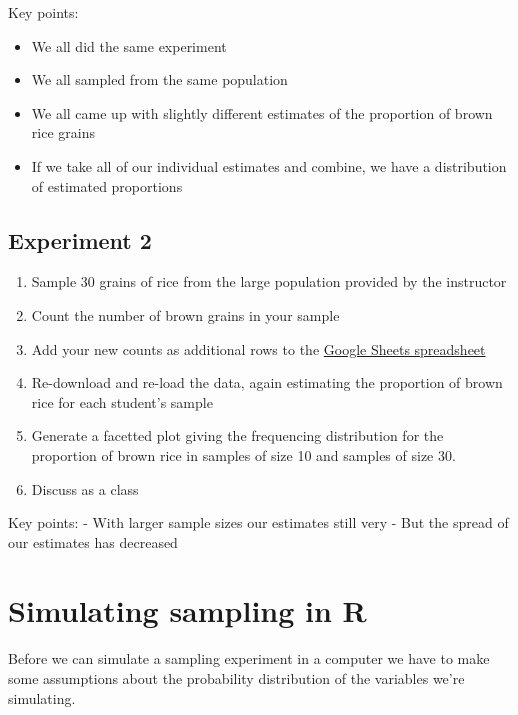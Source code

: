 \documentclass[]{book}
\providecommand{\tightlist}{%
  \setlength{\itemsep}{0pt}\setlength{\parskip}{0pt}}
\theoremstyle{definition}
\theoremstyle{definition}
\theoremstyle{definition}
\theoremstyle{remark}
\begin{document}
Key points:

\begin{itemize}
\tightlist
\item
  We all did the same experiment
\item
  We all sampled from the same population
\item
  We all came up with slightly different estimates of the proportion of
  brown rice grains
\item
  If we take all of our individual estimates and combine, we have a
  distribution of estimated proportions
\end{itemize}

\hypertarget{experiment-2}{%
\subsection{Experiment 2}\label{experiment-2}}

\begin{enumerate}
\def\labelenumi{\arabic{enumi}.}
\tightlist
\item
  Sample 30 grains of rice from the large population provided by the
  instructor
\item
  Count the number of brown grains in your sample
\item
  Add your new counts as additional rows to the
  \href{https://docs.google.com/spreadsheets/d/1nlg-oarr0_1xcKPsfIiUF8UGAsDXXmTmIJMH-Wj9P70/edit?usp=sharing}{Google
  Sheets spreadsheet}
\item
  Re-download and re-load the data, again estimating the proportion of
  brown rice for each student's sample
\item
  Generate a facetted plot giving the frequencing distribution for the
  proportion of brown rice in samples of size 10 and samples of size 30.
\item
  Discuss as a class
\end{enumerate}

Key points: - With larger sample sizes our estimates still very - But
the spread of our estimates has decreased

\hypertarget{simulating-sampling-in-r}{%
\section{Simulating sampling in R}\label{simulating-sampling-in-r}}

Before we can simulate a sampling experiment in a computer we have to
make some assumptions about the probability distribution of the
variables we're simulating.
\end{document}
